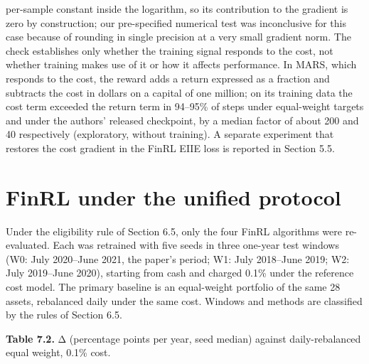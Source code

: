 \documentclass[12pt,a4paper]{report}
\begin{document}
per-sample constant inside the logarithm, so its contribution to the
gradient is zero by construction; our pre-specified numerical test was
inconclusive for this case because of rounding in single precision at a
very small gradient norm. The check establishes only whether the
training signal responds to the cost, not whether training makes use of
it or how it affects performance. In MARS, which responds to the cost,
the reward adds a return expressed as a fraction and subtracts the cost
in dollars on a capital of one million; on its training data the cost
term exceeded the return term in 94--95\% of steps under equal-weight
targets and under the authors' released checkpoint, by a median factor
of about 200 and 40 respectively (exploratory, without training). A
separate experiment that restores the cost gradient in the FinRL EIIE
loss is reported in Section 5.5.

\section{FinRL under the unified
protocol}\label{finrl-under-the-unified-protocol}

Under the eligibility rule of Section 6.5, only the four FinRL
algorithms were re-evaluated. Each was retrained with five seeds in
three one-year test windows (W0: July 2020--June 2021, the paper's
period; W1: July 2018--June 2019; W2: July 2019--June 2020), starting
from cash and charged 0.1\% under the reference cost model. The primary
baseline is an equal-weight portfolio of the same 28 assets, rebalanced
daily under the same cost. Windows and methods are classified by the
rules of Section 6.5.

\textbf{Table 7.2.} Δ (percentage points per year, seed median) against
daily-rebalanced equal weight, 0.1\% cost.
\end{document}
